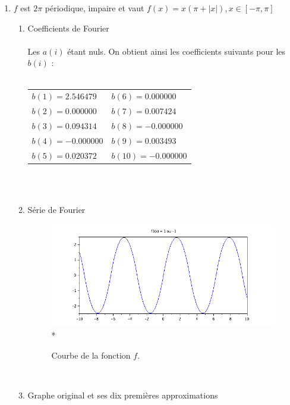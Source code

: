\documentclass[a4paper,12pt]{report}
\begin{document}
\begin{enumerate}
		\item $f$ est $2\pi$ p\'eriodique, impaire et vaut $f(x)=x(\pi + |x|), x \in [-\pi,\pi]$ \\
		\begin{enumerate}
			\item Coefficients de Fourier \\ \\
			Les $a(i)$ \'etant nuls. On obtient ainsi les coefficients suivants pour les $b(i)$ : \\ \\
			\begin{tabular}{l l}
				$b(1) = 2.546479$ & \hspace*{2cm}$b(6) = 0.000000$\\
				$b(2) = 0.000000$ & \hspace*{2cm}$b(7) = 0.007424$\\
				$b(3) = 0.094314$ & \hspace*{2cm}$b(8) = -0.000000$\\
				$b(4) = -0.000000$ & \hspace*{2cm}$b(9) = 0.003493$\\
				$b(5) = 0.020372$ & \hspace*{2cm}$b(10) = -0.000000$\\
			\end{tabular}\\ \\
			\item S\'erie de Fourier
			\begin{figure}[h!]
				\centering
				\includegraphics[scale=0.6]{ex1_fig5_0.png}\\*
				\caption{\label{ex1_figure5_0}Courbe de la fonction $f$.}
			\end{figure}\\
			\newpage
			\item Graphe original et ses dix premi\`eres approximations
			\begin{figure}[h!]

\end{figure}
\end{enumerate}
\end{enumerate}
\end{document}
